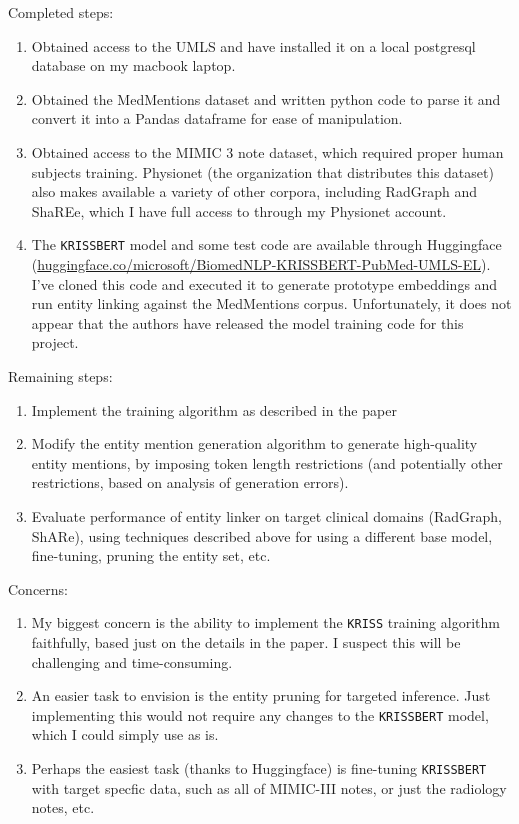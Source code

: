 \documentclass{article}
\begin{document}
Completed steps:

\begin{enumerate}
  \item \checkmark Obtained access to the UMLS and have installed it on a local postgresql database on my macbook laptop.
  \item \checkmark Obtained the MedMentions dataset and written python code to parse it and convert it into a Pandas dataframe for ease of manipulation.
  \item \checkmark Obtained access to the MIMIC 3 note dataset, which required proper human subjects training. Physionet (the organization that distributes this dataset) also makes available a variety of other corpora, including RadGraph and ShaREe, which I have full access to through my Physionet account.
  \item \checkmark The \texttt{KRISSBERT} model and some test code are available through Huggingface (\url{huggingface.co/microsoft/BiomedNLP-KRISSBERT-PubMed-UMLS-EL}). I've cloned this code and executed it to generate prototype embeddings and run entity linking against the MedMentions corpus. Unfortunately, it does not appear that the authors have released the model training code for this project.
\end{enumerate}

Remaining steps:

\begin{enumerate}
  \item Implement the training algorithm as described in the paper
  \item Modify the entity mention generation algorithm to generate high-quality entity mentions, by imposing token length restrictions (and potentially other restrictions, based on analysis of generation errors).
  \item Evaluate performance of entity linker on target clinical domains (RadGraph, ShARe), using techniques described above for using a different base model, fine-tuning, pruning the entity set, etc.
\end{enumerate}

Concerns:

\begin{enumerate}
  \item My biggest concern is the ability to implement the \texttt{KRISS} training algorithm faithfully, based just on the details in the paper. I suspect this will be challenging and time-consuming.
  \item An easier task to envision is the entity pruning for targeted inference. Just implementing this would not require any changes to the \texttt{KRISSBERT} model, which I could simply use as is.
  \item Perhaps the easiest task (thanks to Huggingface) is fine-tuning \texttt{KRISSBERT} with target specfic data, such as all of MIMIC-III notes, or just the radiology notes, etc.
\end{enumerate}

\medskip
\printbibliography
\end{document}

